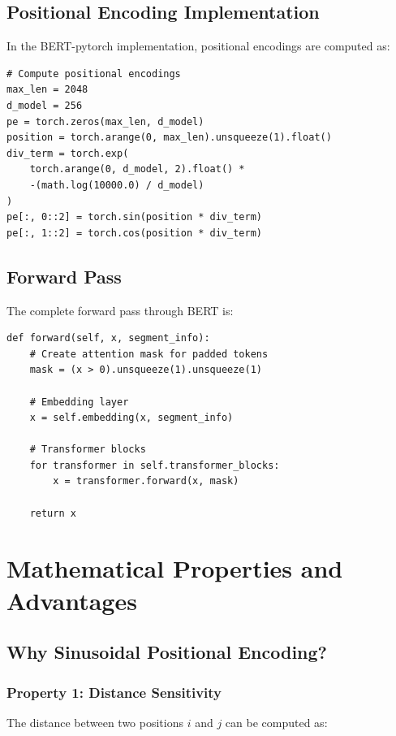 \documentclass[11pt,a4paper]{article}
\begin{document}
\subsection{Positional Encoding Implementation}

In the BERT-pytorch implementation, positional encodings are computed as:

\begin{lstlisting}
# Compute positional encodings
max_len = 2048
d_model = 256
pe = torch.zeros(max_len, d_model)
position = torch.arange(0, max_len).unsqueeze(1).float()
div_term = torch.exp(
    torch.arange(0, d_model, 2).float() *
    -(math.log(10000.0) / d_model)
)
pe[:, 0::2] = torch.sin(position * div_term)
pe[:, 1::2] = torch.cos(position * div_term)
\end{lstlisting}

\subsection{Forward Pass}

The complete forward pass through BERT is:

\begin{lstlisting}
def forward(self, x, segment_info):
    # Create attention mask for padded tokens
    mask = (x > 0).unsqueeze(1).unsqueeze(1)

    # Embedding layer
    x = self.embedding(x, segment_info)

    # Transformer blocks
    for transformer in self.transformer_blocks:
        x = transformer.forward(x, mask)

    return x
\end{lstlisting}

\section{Mathematical Properties and Advantages}

\subsection{Why Sinusoidal Positional Encoding?}

\subsubsection{Property 1: Distance Sensitivity}

The distance between two positions $i$ and $j$ can be computed as:
\end{document}
